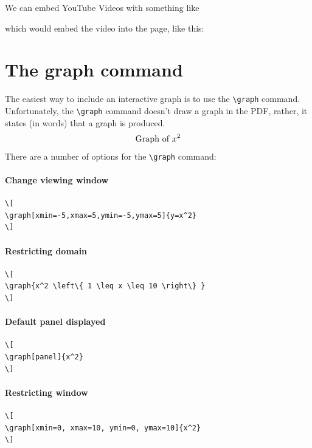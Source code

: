 \documentclass{ximera}
\begin{document}
We can embed YouTube Videos with something like
\begin{code}
  \begin{center}
  \end{center}
\end{code}
which would embed the video into the page, like this:
\begin{center}
\end{center}

\section{The graph command}

The easiest way to include an interactive graph is to use the
\verb|\graph| command. Unfortunately, the \verb|\graph| command
doesn't draw a graph in the PDF, rather, it states (in words) that a
graph is produced.
\[
  \text{Graph of $x^2$}
\]
There are a number of options for the \verb|\graph| command:

\paragraph{Change viewing window}
\begin{verbatim}
\[
\graph[xmin=-5,xmax=5,ymin=-5,ymax=5]{y=x^2}
\]
\end{verbatim}

\paragraph{Restricting domain}

\begin{verbatim}
\[
\graph{x^2 \left\{ 1 \leq x \leq 10 \right\} }
\]
\end{verbatim}
\paragraph{Default panel displayed}

\begin{verbatim}
\[
\graph[panel]{x^2}
\]
\end{verbatim}
\paragraph{Restricting window}

\begin{verbatim}
\[
\graph[xmin=0, xmax=10, ymin=0, ymax=10]{x^2}
\]
\end{verbatim}
\end{document}
